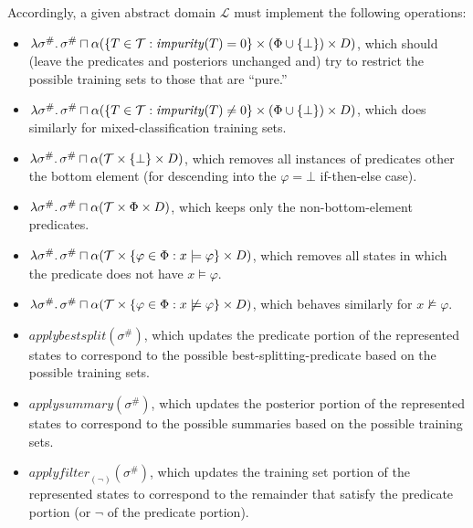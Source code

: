 Accordingly, a given abstract domain $\mathcal{L}$ must implement the following operations:
\begin{itemize}
    \item $\lambda \sigma^\# \ldotp \sigma^\# \sqcap
        \alpha(\{T \in \mathcal{T} : \mathit{impurity}(T) = 0\} \times (\Phi \cup \{\bot\}) \times D)$,
        which should (leave the predicates and posteriors unchanged and)
        try to restrict the possible training sets to those that are ``pure.''
    \item $\lambda \sigma^\# \ldotp \sigma^\# \sqcap
        \alpha(\{T \in \mathcal{T} : \mathit{impurity}(T) \neq 0\} \times (\Phi \cup \{\bot\}) \times D)$,
        which does similarly for mixed-classification training sets.
    \item $\lambda \sigma^\# \ldotp \sigma^\# \sqcap
        \alpha(\mathcal{T} \times \{\bot\} \times D)$,
        which removes all instances of predicates other the bottom element
        (for descending into the $\varphi = \bot$ if-then-else case).
    \item $\lambda \sigma^\# \ldotp \sigma^\# \sqcap
        \alpha(\mathcal{T} \times \Phi \times D)$,
        which keeps only the non-bottom-element predicates.
    \item $\lambda \sigma^\# \ldotp \sigma^\# \sqcap
        \alpha(\mathcal{T} \times \{\varphi \in \Phi : x \models \varphi\} \times D)$,
        which removes all states in which the predicate does not have $x \models \varphi$.
    \item $\lambda \sigma^\# \ldotp \sigma^\# \sqcap
        \alpha(\mathcal{T} \times \{\varphi \in \Phi : x \not\models \varphi\} \times D)$,
        which behaves similarly for $x \not\models \varphi$.
    \item $\mathit{applybestsplit}(\sigma^\#)$,
        which updates the predicate portion of the represented states
        to correspond to the possible best-splitting-predicate
        based on the possible training sets.
    \item $\mathit{applysummary}(\sigma^\#)$,
        which updates the posterior portion of the represented states
        to correspond to the possible summaries
        based on the possible training sets.
    \item $\mathit{applyfilter}_{(\lnot)}(\sigma^\#)$,
        which updates the training set portion of the represented states
        to correspond to the remainder that satisfy the predicate portion
        (or $\lnot$ of the predicate portion).
\end{itemize}

